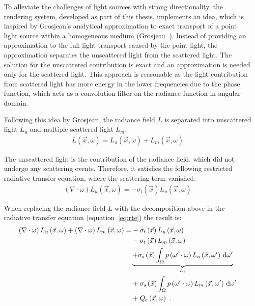 To alleviate the challenges of light sources with strong directionality, the rendering system, developed as part of this thesis, implements an idea, which is inspired by Grosjean’s analytical approximation to exact transport of a point light source within a homogeneous medium (Grosjean~\cite{Grosjean56}). Instead of providing an approximation to the full light transport caused by the point light, the approximation separates the unscattered light from the scattered light. The solution for the unscattered contribution is exact and an approximation is needed only for the scattered light. This approach is reasonable as the light contribution from scattered light has more energy in the lower frequencies due to the phase function, which acts as a convolution filter on the radiance function in angular domain.

Following this idea by Grosjean, the radiance field $L$ is separated into unscattered light $L_{u}$ and multiple scattered light $L_m$:
\begin{align}
L\left(\vec{x}, \omega\right) = 
L_u\left(\vec{x}, \omega\right)
+L_m\left(\vec{x}, \omega\right)
\end{align}

The unscattered light is the contribution of the radiance field, which did not undergo any scattering events. Therefore, it satisfies the following restricted radiative transfer equation, where the scattering term vanished:
\begin{align}
\left(\nabla\cdot\omega\right)L_u\left(\vec{x}, \omega \right)
=
-\sigma_t\left(\vec{x}\right) L_u\left(\vec{x}, \omega \right)
\label{eq:restricted_rte}
\end{align}


When replacing the radiance field $L$ with the decomposition above in the radiative transfer equation (equation~\ref{eq:rte}) the result is:
\begin{align}
\left(\nabla\cdot\omega\right)L_u\left(\vec{x}, \omega \right)
+\left(\nabla\cdot\omega\right)L_m\left(\vec{x}, \omega \right)
=&
-\sigma_t\left(\vec{x}\right) L_u\left(\vec{x}, \omega \right)
\nonumber\\
&
-\sigma_t\left(\vec{x}\right) L_m\left(\vec{x}, \omega \right)\nonumber\\
&
\underbrace
{
+\sigma_s\left(\vec{x}\right) \int_{\Omega}
{
p\left(\omega'\cdot\omega\right)L_u\left(\vec{x}, \omega' \right)\,\mathrm{d}\omega'
}
}_{L_s}
\nonumber\\
&
+\sigma_s\left(\vec{x}\right) \int_{\Omega}
{
p\left(\omega'\cdot\omega\right)L_m\left(\vec{x}, \omega' \right)\,\mathrm{d}\omega'
}
\nonumber
\\
&
+Q_e\left(\vec{x}, \omega\right)
\nonumber
\  .
\end{align}

